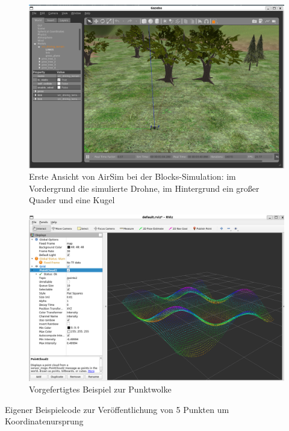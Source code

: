\begin{figure}[!ht]
    \centering
    \includegraphics[width=\linewidth]{images/sim_gazebo.png}
    \caption[Ansicht Gazebo Simulator]{Erste Ansicht von AirSim bei der Blocks-Simulation: im Vordergrund die simulierte Drohne, im Hintergrund ein großer Quader und eine Kugel}
    \label{fig:sim_airsim}
\end{figure}

\begin{figure}[!ht]
    \centering
    \includegraphics[width=\linewidth]{images/ultra_pc_example.png}
    \caption{Vorgefertigtes Beispiel zur Punktwolke}
    \label{fig:ultra_pc_ex}
\end{figure}

\begin{listing}[!ht]
    \caption{Eigener Beispielcode zur Veröffentlichung von 5 Punkten um Koordinatenursprung}
    \label{listing:pcl_test.py}
\end{listing}
